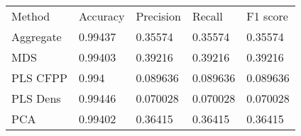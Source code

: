 \begin{table}[!hb]
	\centering
	\begin{tabular}{lllll}
		Method		& Accuracy	& Precision	& Recall	& F1 score\\
		Aggregate	& 0.99437	& 0.35574	& 0.35574	& 0.35574\\
		MDS		& 0.99403	& 0.39216	& 0.39216	& 0.39216\\
		PLS CFPP	& 0.994		& 0.089636	& 0.089636	& 0.089636\\
		PLS Dens	& 0.99446	& 0.070028	& 0.070028	& 0.070028\\
		PCA		& 0.99402	& 0.36415	& 0.36415	& 0.36415\\
	\end{tabular}
\end{table}

